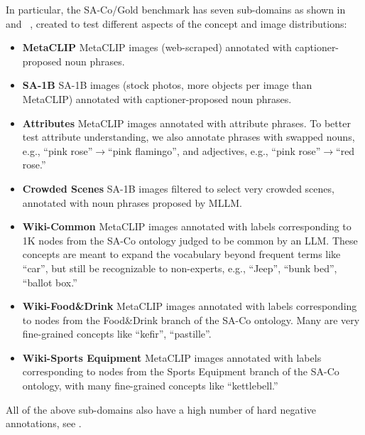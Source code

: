 \documentclass[]{fairmeta}
\newcommand{\eg}{e.g., }
\newcommand{\dsname}{{SA-Co}\xspace}
\newcommand{\evalgold}{{\dsname/Gold}\xspace}
\begin{document}
In particular, the \evalgold benchmark has seven sub-domains as shown in~ and ~, created to test different aspects of the concept and image distributions:
\begin{itemize}
    \item \textbf{MetaCLIP} MetaCLIP images (web-scraped) annotated with captioner-proposed noun phrases.
    \item \textbf{SA-1B} SA-1B images (stock photos, more objects per image than MetaCLIP) annotated with captioner-proposed noun phrases.
    \item \textbf{Attributes} MetaCLIP images annotated with attribute phrases. To better test attribute understanding, we also annotate phrases with swapped nouns, \eg ``pink rose''$\rightarrow$``pink flamingo'', and adjectives, \eg ``pink rose''$\rightarrow$``red rose.'' 
    \item \textbf{Crowded Scenes} SA-1B images filtered to select very crowded scenes, annotated with noun phrases proposed by MLLM.
    \item \textbf{Wiki-Common} MetaCLIP images annotated with labels corresponding to 1K nodes from the \dsname ontology judged to be common by an LLM. These concepts are meant to expand the vocabulary beyond frequent terms like ``car'', but still be recognizable to non-experts,  \eg ``Jeep'', ``bunk bed'', ``ballot box.''
    \item \textbf{Wiki-Food\&Drink} MetaCLIP images annotated with labels corresponding to nodes from the Food\&Drink branch of the \dsname ontology. Many are very fine-grained concepts like ``kefir'', ``pastille''. 
    \item \textbf{Wiki-Sports Equipment} MetaCLIP images annotated with labels corresponding to nodes from the Sports Equipment branch of the \dsname ontology, with many fine-grained concepts like ``kettlebell.''
\end{itemize}
All of the above sub-domains also have a high number of hard negative annotations, see .
\end{document}
